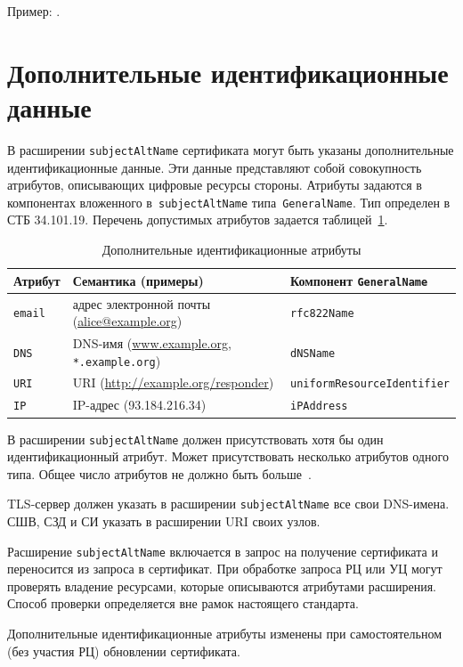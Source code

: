 Пример: .

\section{Дополнительные идентификационные данные}\label{ENTITIES.SAN}

В расширении \texttt{subjectAltName} сертификата могут быть указаны 
дополнительные идентификационные данные. Эти данные представляют собой 
совокупность атрибутов, описывающих цифровые ресурсы стороны. 
%
Атрибуты задаются в компонентах вложенного в~\texttt{subjectAltName} 
типа~\texttt{GeneralName}. Тип определен в СТБ 34.101.19.
%
Перечень допустимых атрибутов задается таблицей~\ref{Table.ENTITIES.AttrsEx}. 

\begin{table}[bht]
\caption{Дополнительные идентификационные атрибуты}
\label{Table.ENTITIES.AttrsEx}
\begin{tabular}{|l|p{8.9cm}|l|}
\hline
Атрибут & Семантика (примеры) & Компонент \texttt{GeneralName}\\
\hline
\hline
\texttt{email} & 
адрес электронной почты (\url{alice@example.org}) & 
\verb|rfc822Name|\\
%
\texttt{DNS} & 
DNS-имя (\url{www.example.org}, \texttt{*.example.org}) &
\verb|dNSName|\\
%
\texttt{URI} & 
URI (\url{http://example.org/responder}) &
\verb|uniformResourceIdentifier|\\
%
\texttt{IP} & 
IP-адрес (93.184.216.34) &
\verb|iPAddress|\\
\hline                                      
\end{tabular}
\end{table}

В расширении \texttt{subjectAltName} должен присутствовать хотя бы один 
идентификационный атрибут. Может присутствовать несколько атрибутов одного 
типа. Общее число атрибутов не должно быть больше~.

TLS-сервер должен указать в расширении \texttt{subjectAltName}
все свои DNS-имена. СШВ, СЗД и СИ  указать в расширении 
URI своих узлов.

Расширение \texttt{subjectAltName} включается в запрос на получение 
сертификата и переносится из запроса в сертификат.
При обработке запроса РЦ или УЦ могут проверять владение ресурсами,
которые описываются атрибутами расширения. 
%
Способ проверки определяется вне рамок настоящего стандарта.

Дополнительные идентификационные атрибуты  
изменены при самостоятельном (без участия РЦ) обновлении сертификата.

